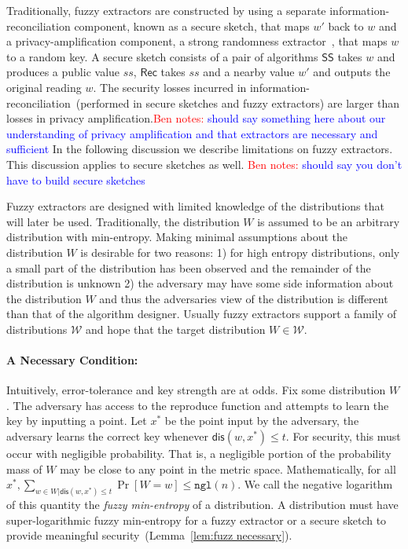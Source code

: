 \documentclass[11pt]{article}
\newcommand{\lemref}[1]{\mbox{Lemma~\ref{#1}}}
\newcommand{\class}[1]{{\ensuremath{\mathsf{#1}}}}
\newcommand{\sketch}{\ensuremath{\class{SS}}\xspace}
\newcommand{\rec}{\ensuremath{\class{Rec}}\xspace}
\newcommand{\dis}{\ensuremath{\mathsf{dis}}}
\newcommand{\ngl}{\ensuremath{\mathtt{ngl}}\xspace}
\newcommand{\authnote}[2]{{\textcolor{red}{\textsf{#1 notes: }\textcolor{blue}{ #2}}\marginpar{\textcolor{red}{\textbf{!!!!!}}}}}
\newcommand{\authnote}[2]{}
\newcommand{\bnote}[1]{{\authnote{Ben}{#1}}}
\begin{document}
Traditionally, fuzzy extractors are constructed by using a separate information-reconciliation component, known as a secure sketch, that maps $w'$ back to $w$ and a privacy-amplification component, a strong randomness extractor~\cite{nisan1993randomness}, that maps $w$ to a random key.  A secure sketch consists of a pair of algorithms $\sketch$ takes $w$ and produces a public value $ss$, $\rec$ takes $ss$ and a nearby value $w'$ and outputs the original reading $w$.  The security losses incurred in information-reconciliation~(performed in secure sketches and fuzzy extractors) are larger than losses in privacy amplification.\bnote{should say something here about our understanding of privacy amplification and that extractors are necessary and sufficient} In the following discussion we describe limitations on fuzzy extractors.  This discussion applies to secure sketches as well. \bnote{should say you don't have to build secure sketches}

Fuzzy extractors are designed with limited knowledge of the distributions that will later be used.  Traditionally, the distribution $W$ is assumed to be an arbitrary distribution with min-entropy.  Making minimal assumptions about the distribution $W$ is desirable for two reasons: 1) for high entropy distributions, only a small part of the distribution has been observed and the remainder of the distribution is unknown 2) the adversary may have some side information about the distribution $W$ and thus the adversaries view of the distribution is different than that of the algorithm designer.  Usually fuzzy extractors support a family of distributions $\mathcal{W}$ and hope that the target distribution $W\in\mathcal{W}$.

\paragraph{A Necessary Condition:}  Intuitively, error-tolerance and key strength are at odds.  Fix some distribution $W$.  The adversary has access to the reproduce function and attempts to learn the key by inputting a point.  Let $x^*$ be the point input by the adversary, the adversary learns the correct key whenever $\dis(w, x^*)\le t$.  For security, this must occur with negligible probability.  That is, a negligible portion of the probability mass of $W$ may be close to any point in the metric space.  Mathematically, for all $x^*, \sum_{w\in W | \dis(w, x^*)\le t} \Pr[ W= w] \le \ngl(n)$.  We call the negative logarithm of this quantity the \emph{fuzzy min-entropy} of a distribution.  A distribution must have super-logarithmic fuzzy min-entropy for a fuzzy extractor or a secure sketch  to provide meaningful security~(\lemref{lem:fuzz necessary}).  
\end{document}
